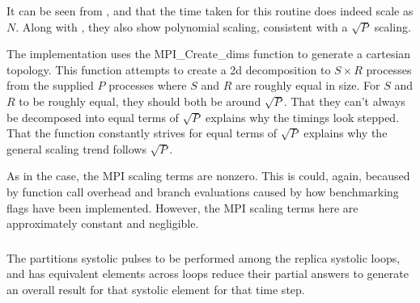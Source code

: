 %
It can be seen from
,
 and
that the time taken for this routine does indeed scale as $N$.
%
Along with 
,
they also show polynomial scaling, consistent with a $\sqrt{P}$ scaling.

The implementation uses the MPI\_Create\_dims function to generate a
cartesian topology.
%
This function attempts to create a 2d decomposition to $S \times{} R$
processes from the supplied $P$ processes where $S$ and $R$ are roughly
equal in size.
%
For $S$ and $R$ to be roughly equal, they should both be around $\sqrt{P}$.
%
That they can't always be decomposed into equal terms of $\sqrt{P}$
explains why the timings look stepped.
%
That the function constantly strives for equal terms of $\sqrt{P}$
explains why the general scaling trend follows $\sqrt{P}$.

As in the \systolicloop{} case, the MPI scaling terms are nonzero.
%
This is could, again, becaused by function call overhead and
branch evaluations caused by how benchmarking flags have been implemented.
%
However, the MPI scaling terms here are approximately constant and negligible.


\subsubsection{\pairoperation{}}

The \pairoperation{} partitions systolic pulses to be performed among
the replica systolic loops, and has equivalent elements across loops
reduce their partial answers to generate an overall result for that
systolic element for that time step.

%
%
\begin{figure}[!h]
    
    \caption{
        \vZeroSpeedupCaption
            {\replicatedsystolicloop{}}
            {\pairoperation{}}
    }
    \label{fig:v1_replicated_systolic_pair_operation_speedups}
\end{figure}


\vZeroSpeedupExplanation
    {}
    {\replicatedsystolicloop{}}
    {\pairoperation{}}


